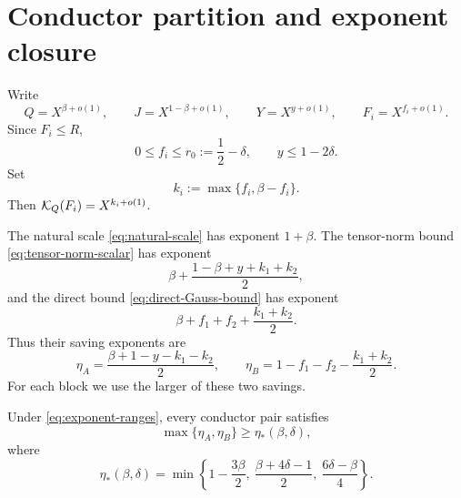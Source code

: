 \section{Conductor partition and exponent closure}
\label{sec:exponent-closure}

Write
\begin{equation}
 Q=X^{\beta+o(1)},\qquad J=X^{1-\beta+o(1)},\qquad
 Y=X^{y+o(1)},\qquad F_i=X^{f_i+o(1)}.
 \label{eq:exponent-notation}
\end{equation}
Since \(F_i\le R\),
\begin{equation}
 0\le f_i\le r_0:=\frac12-\delta,
 \qquad y\le1-2\delta.
 \label{eq:exponent-ranges}
\end{equation}
Set
\begin{equation}
 k_i:=\max\{f_i,\beta-f_i\}.
 \label{eq:k-def}
\end{equation}
Then
\(\mathcal K_Q(F_i)=X^{k_i+o(1)}\).

The natural scale \eqref{eq:natural-scale} has exponent \(1+\beta\).
The tensor-norm bound \eqref{eq:tensor-norm-scalar} has exponent
\[
 \beta+\frac{1-\beta+y+k_1+k_2}{2},
\]
and the direct bound \eqref{eq:direct-Gauss-bound} has exponent
\[
 \beta+f_1+f_2+\frac{k_1+k_2}{2}.
\]
Thus their saving exponents are
\begin{equation}
 \eta_A=\frac{\beta+1-y-k_1-k_2}{2},
 \qquad
 \eta_B=1-f_1-f_2-\frac{k_1+k_2}{2}.
 \label{eq:eta-AB}
\end{equation}
For each block we use the larger of these two savings.

\begin{proposition}
\label{prop:three-cell-ledger}
Under \eqref{eq:exponent-ranges}, every conductor pair satisfies
\begin{equation}
 \max\{\eta_A,\eta_B\}\ge
 \eta_*(\beta,\delta),
 \label{eq:eta-star-bound}
\end{equation}
where
\begin{equation}
 \boxed{
 \eta_*(\beta,\delta)=
 \min\left\{
 1-\frac{3\beta}{2},\
 \frac{\beta+4\delta-1}{2},\
 \frac{6\delta-\beta}{4}
 \right\}.}
 \label{eq:eta-star}
\end{equation}
\end{proposition}

